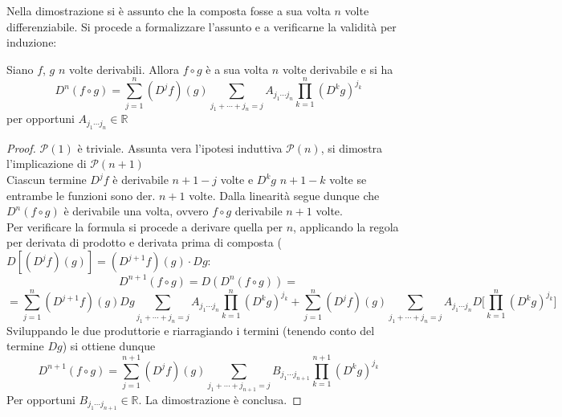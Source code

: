 \documentclass[10pt, oneside]{book}
\theoremstyle{plain}
\begin{document}
Nella dimostrazione si è assunto che la composta fosse a sua volta $n$ volte differenziabile. Si procede a formalizzare l'assunto e a verificarne la validità per induzione:
\begin{prop}
    Siano $f$, $g$ $n$ volte derivabili. Allora $f \circ g$ è a sua volta $n$ volte derivabile e si ha
    \[D^n(f\circ g) = \sum \limits_{j=1}^{n}(D^jf)(g)\sum \limits_{j_1 + \cdots + j_n = j} A_{j_1 \cdots j_n} \prod\limits_{k=1}^n(D^kg)^{j_k}\]
    per opportuni $A_{j_1 \cdots j_n} \in \mathbb{R}$
\end{prop}
\begin{proof}
    $\mathcal{P}(1)$ è triviale. Assunta vera l'ipotesi induttiva $\mathcal{P}(n)$, si dimostra l'implicazione di $\mathcal{P}(n+1)$
    \\Ciascun termine $D^jf$ è derivabile $n+1-j$ volte e $D^kg$ $n+1-k$ volte se entrambe le funzioni sono der. $n+1$ volte. Dalla linearità segue dunque che $D^n(f \circ g)$ è derivabile una volta, ovvero $f\circ g$ derivabile $n+1$ volte.
    \\Per verificare la formula si procede a derivare quella per $n$, applicando la regola per derivata di prodotto e derivata prima di composta ($D[(D^jf)(g)] = (D^{j+1}f)(g)\cdot Dg$:
    \[D^{n+1}(f \circ g) = D(D^n(f \circ g)) = \]
    \[= \sum \limits_{j=1}^{n}(D^{j+1}f)(g)Dg\sum \limits_{j_1 + \cdots + j_n = j} A_{j_1 \cdots j_n} \prod\limits_{k=1}^n(D^kg)^{j_k} + \sum \limits_{j=1}^{n}(D^jf)(g)\sum \limits_{j_1 + \cdots + j_n = j} A_{j_1 \cdots j_n} D\bigg[\prod\limits_{k=1}^n(D^kg)^{j_k}\bigg]\]
    Sviluppando le due produttorie e riarragiando i termini (tenendo conto del termine $Dg$) si ottiene dunque
    \[D^{n+1}(f \circ g) = \sum \limits_{j=1}^{n+1}(D^jf)(g)\sum \limits_{j_1 + \cdots + j_{n+1} = j} B_{j_1 \cdots j_{n+1}} \prod\limits_{k=1}^{n+1}(D^kg)^{j_k}\]
    Per opportuni $B_{j_1 \cdots j_{n+1}} \in \mathbb{R}$. La dimostrazione è conclusa.
\end{proof}
\end{document}
